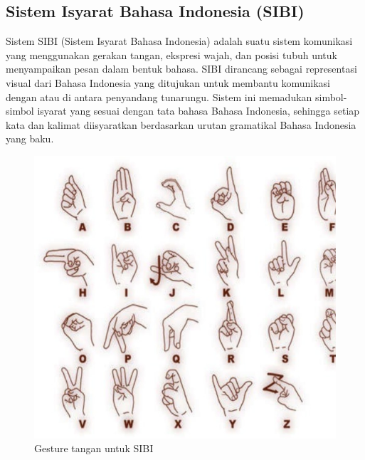 \subsection{Sistem Isyarat Bahasa Indonesia (SIBI)}
Sistem SIBI (Sistem Isyarat Bahasa Indonesia) adalah suatu sistem komunikasi yang menggunakan gerakan tangan, ekspresi wajah, dan posisi tubuh untuk menyampaikan pesan dalam bentuk bahasa. SIBI dirancang sebagai representasi visual dari Bahasa Indonesia yang ditujukan untuk membantu komunikasi dengan atau di antara penyandang tunarungu. Sistem ini memadukan simbol-simbol isyarat yang sesuai dengan tata bahasa Bahasa Indonesia, sehingga setiap kata dan kalimat diisyaratkan berdasarkan urutan gramatikal Bahasa Indonesia yang baku.\begin{figure} [H] \centering
  \includegraphics[scale=0.7]{gambar/SIBI Gesture.png}
  \caption{Gesture tangan untuk SIBI }
  \label{fig:Sibi}
\end{figure}
